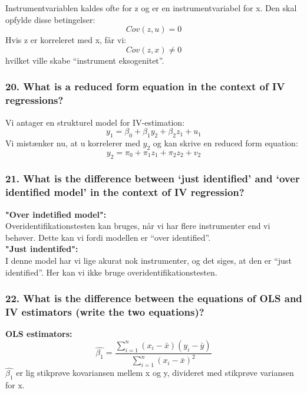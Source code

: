 \documentclass[
  10pt,
]{article}
\begin{document}
Instrumentvariablen kaldes ofte for z og er en instrumentvariabel for x.
Den skal opfylde disse betingelser: \[Cov(z,u)=0 \] Hvis z er korreleret
med x, får vi: \[ Cov(z,x)\neq0\] hvilket ville skabe ``instrument
eksogenitet''.

\hypertarget{what-is-a-reduced-form-equation-in-the-context-of-iv-regressions}{%
\subsubsection{20. What is a reduced form equation in the context of IV
regressions?}\label{what-is-a-reduced-form-equation-in-the-context-of-iv-regressions}}

Vi antager en strukturel model for IV-estimation:
\[ y_1=\beta_0+\beta_1y_2+\beta_2z_1+u_1 \] Vi mistænker nu, at u
korrelerer med \(y_2\) og kan skrive en reduced form equation:
\[ y_2=\pi_0+\pi_1z_1+\pi_2z_2+v_2\]

\hypertarget{what-is-the-difference-between-just-identified-and-over-identified-model-in-the-context-of-iv-regression}{%
\subsubsection{21. What is the difference between `just identified' and
`over identified model' in the context of IV
regression?}\label{what-is-the-difference-between-just-identified-and-over-identified-model-in-the-context-of-iv-regression}}

\textbf{"Over indetified model":}\\
Overidentifikationstesten kan bruges, når vi har flere instrumenter end
vi behøver. Dette kan vi fordi modellen er ``over identified''.\\
\textbf{"Just indentifed":}\\
I denne model har vi lige akurat nok instrumenter, og det siges, at den
er ``just identified''. Her kan vi ikke bruge overidentifikationstesten.

\hypertarget{what-is-the-difference-between-the-equations-of-ols-and-iv-estimators-write-the-two-equations}{%
\subsubsection{22. What is the difference between the equations of OLS
and IV estimators (write the two
equations)?}\label{what-is-the-difference-between-the-equations-of-ols-and-iv-estimators-write-the-two-equations}}

\textbf{OLS estimators:}\\
\[\hat{\beta_1}= \frac{\sum\limits_{i=1}^n(x_i-\bar{x})(y_i-\bar{y})}{\sum\limits_{i=1}^n(x_i-\bar{x})^2}\]
\(\hat{\beta_1}\) er lig stikprøve kovariansen mellem x og y, divideret
med stikprøve variansen for x.\\
\end{document}
